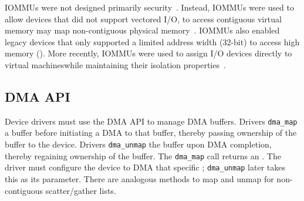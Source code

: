 IOMMUs were not designed primarily \DIFdelbegin {}\DIFdelend \DIFaddbegin {}\DIFaddend security~\cite{DWT79}. Instead, IOMMUs were used to allow devices that did not support vectored I/O, to access contiguous virtual memory \DIFdelbegin {}\DIFdelend \DIFaddbegin {}\DIFaddend may map non-contiguous physical memory~\cite{Chu96, WMM97}. IOMMUs also enabled legacy devices that only supported a limited address width (32-bit) \DIFdelbegin \DIFdel{, }\DIFdelend to access high memory (\DIFdelbegin {}\DIFdelend \DIFaddbegin {}\DIFaddend ). More recently, IOMMUs were used to assign I/O devices directly to virtual machines\DIFaddbegin \DIFadd{, }\DIFaddend while maintaining their isolation properties~\cite{Int16b, AMD16}. 
\subsection{DMA API}
Device drivers must use the DMA API to manage \DIFaddbegin {}\DIFaddend DMA buffers. Drivers \texttt{dma\_map} a buffer before initiating a DMA to that buffer, thereby passing ownership of
the buffer to the device. Drivers \texttt{dma\_unmap} the buffer upon
DMA completion, thereby regaining ownership of the buffer.
The \texttt{dma\_map} call returns an \iova. The driver must configure the device to DMA \DIFdelbegin {}\DIFdelend \DIFaddbegin {}\DIFaddend that specific \iova;
\texttt{dma\_unmap} later takes this \iova as its parameter. There are analogous methods to map and unmap for non-contiguous scatter/gather lists.